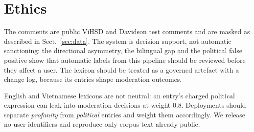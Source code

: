 \section{Ethics}
\label{sec:ethics}

The comments are public ViHSD and Davidson test comments and are masked as
described in Sect.~\ref{sec:data}.  The system is decision support, not
automatic sanctioning: the directional asymmetry, the bilingual gap and the
political false positive show that automatic \hate{} labels from this pipeline
should be reviewed before they affect a user.  The lexicon should be treated as
a governed artefact with a change log, because its entries shape moderation
outcomes.

English and Vietnamese lexicons are not neutral: an entry's charged political
expression can leak into moderation decisions at weight 0.8.  Deployments
should separate \emph{profanity} from \emph{political} entries and weight them
accordingly.  We release no user identifiers and reproduce only corpus text
already public.